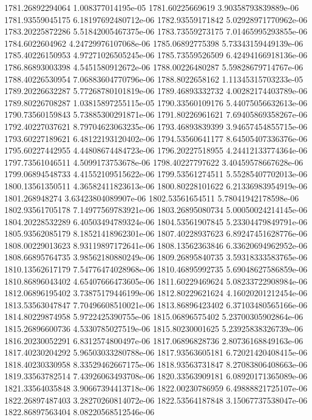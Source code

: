 {1781.26892294064 1.008377014195e-05
1781.60225669619 3.90358793839889e-06
1781.93559045175 6.18197692480712e-06
1782.93559171842 5.02928971770962e-06
1783.20225872286 5.51842005467375e-06
1783.73559273175 7.01465995293855e-06
1784.6022604962 4.24729976107068e-06
1785.06892775398 5.73343159449139e-06
1785.40226150953 4.97271026505245e-06
1785.73559526509 6.42494166918136e-06
1786.86893003398 4.5451580912672e-06
1788.00226480287 5.59828679714767e-06
1788.40226530954 7.06883604770796e-06
1788.8022658162 1.11345315703233e-05
1789.20226632287 5.77268780101819e-06
1789.46893332732 4.00282174403789e-06
1789.80226708287 1.03815897255115e-05
1790.33560109176 5.44075056632613e-06
1790.73560159843 5.73885300291871e-06
1791.80226961621 7.69405869358267e-06
1792.40227037621 8.79704623063235e-06
1793.46893839399 3.94657454855715e-06
1793.60227189621 6.48122193120402e-06
1794.53560641177 8.64505407336376e-06
1795.60227442955 4.44808674484723e-06
1796.20227518955 4.24412133774364e-06
1797.73561046511 4.5099173753678e-06
1798.40227797622 3.40459578667628e-06
1799.06894548733 4.41552109515622e-06
1799.53561274511 5.55285407702013e-06
1800.13561350511 4.36582411823613e-06
1800.80228101622 6.21336983954919e-06
1801.268948274 3.63423804089907e-06
1802.53561654511 5.78041942178598e-06
1802.93561705178 7.14977569783921e-06
1803.26895080734 5.00050024214145e-06
1804.20228532289 6.40503494789324e-06
1804.53561907845 5.23304479849791e-06
1805.93562085179 8.18521418962301e-06
1807.40228937623 6.89247451628776e-06
1808.00229013623 8.93119897172641e-06
1808.13562363846 6.33620694962952e-06
1808.66895764735 3.98562180880249e-06
1809.26895840735 3.59318333583765e-06
1810.13562617179 7.54776474028968e-06
1810.46895992735 5.69048627586859e-06
1810.86896043402 4.65407666473605e-06
1811.60229469624 5.08233722908984e-06
1812.06896195402 3.73875179446199e-06
1812.80229621624 4.16020201212454e-06
1813.53563047847 7.70496608510021e-06
1813.86896423402 6.37103480565166e-06
1814.80229874958 5.9722425390755e-06
1815.06896575402 5.23700305902864e-06
1815.26896600736 4.5330785027519e-06
1815.80230001625 5.23925838326739e-06
1816.20230052291 6.8312574800497e-06
1817.06896828736 2.80736168849163e-06
1817.40230204292 5.96503033280788e-06
1817.93563605181 6.72021420408415e-06
1818.40230330958 8.33529462667175e-06
1818.93563731847 8.27083806408663e-06
1819.33563782514 7.43926063493708e-06
1820.33563909181 6.08920171365089e-06
1821.33564035848 3.90667394413718e-06
1822.00230786959 6.49888821725107e-06
1822.26897487403 3.28270260814072e-06
1822.53564187848 3.15067737538047e-06
1822.86897563404 8.08220568512546e-06
}
